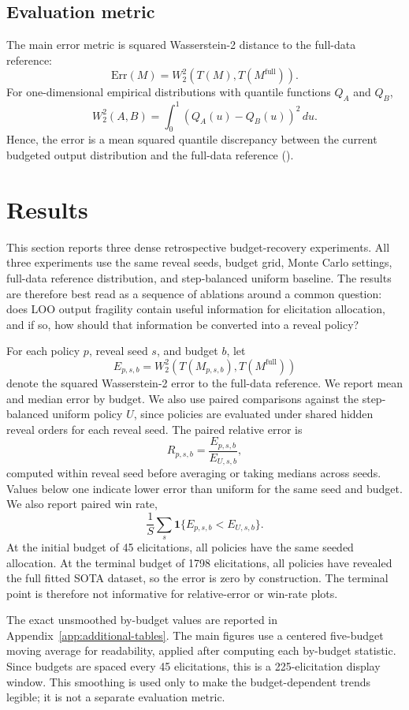 \documentclass[11pt]{article}
\newcommand{\wtsq}{W_2^2}
\begin{document}
\subsection{Evaluation metric}

The main error metric is squared Wasserstein-2 distance to the full-data reference:
\[
\mathrm{Err}(M)=\wtsq\left(T(M),T(M^{\mathrm{full}})\right).
\]
For one-dimensional empirical distributions with quantile functions $Q_A$ and $Q_B$,
\[
\wtsq(A,B)=\int_0^1 \left(Q_A(u)-Q_B(u)\right)^2\,du.
\]
Hence, the error is a mean squared quantile discrepancy between the current budgeted output distribution and the full-data reference (\cite{villani2009optimal}).

\section{Results}

This section reports three dense retrospective budget-recovery experiments. All three experiments use the same reveal seeds, budget grid, Monte Carlo settings, full-data reference distribution, and step-balanced uniform baseline. The results are therefore best read as a sequence of ablations around a common question: does LOO output fragility contain useful information for elicitation allocation, and if so, how should that information be converted into a reveal policy?

For each policy $p$, reveal seed $s$, and budget $b$, let
\[
E_{p,s,b}
=
\wtsq\left(T(M_{p,s,b}),T(M^{\mathrm{full}})\right)
\]
denote the squared Wasserstein-2 error to the full-data reference. We report mean and median error by budget. We also use paired comparisons against the step-balanced uniform policy $U$, since policies are evaluated under shared hidden reveal orders for each reveal seed. The paired relative error is
\[
R_{p,s,b} = \frac{E_{p,s,b}}{E_{U,s,b}},
\]
computed within reveal seed before averaging or taking medians across seeds. Values below one indicate lower error than uniform for the same seed and budget. We also report paired win rate,
\[
\frac{1}{S}\sum_s \mathbf{1}\{E_{p,s,b}<E_{U,s,b}\}.
\]
At the initial budget of 45 elicitations, all policies have the same seeded allocation. At the terminal budget of 1798 elicitations, all policies have revealed the full fitted SOTA dataset, so the error is zero by construction. The terminal point is therefore not informative for relative-error or win-rate plots.

The exact unsmoothed by-budget values are reported in Appendix~\ref{app:additional-tables}. The main figures use a centered five-budget moving average for readability, applied after computing each by-budget statistic. Since budgets are spaced every 45 elicitations, this is a 225-elicitation display window. This smoothing is used only to make the budget-dependent trends legible; it is not a separate evaluation metric.
\end{document}
